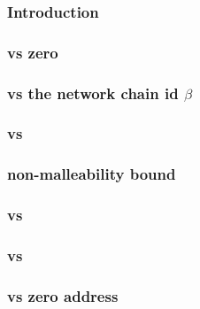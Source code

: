 \subsubsection{Introduction}                                    \label{rlp auth: comparisons: validity: intro}                             
\subsubsection{\locChainId{} vs zero}                           \label{rlp auth: comparisons: validity: chain id iszero}                   
\subsubsection{\locChainId{} vs the network chain id $\beta$}   \label{rlp auth: comparisons: validity: chain id vs network chain id}      
\subsubsection{\locNonce{} vs \maxNonce{}}                      \label{rlp auth: comparisons: validity: nonce EIP 2681 bound}              
\subsubsection{\locSignatureS{} non-malleability bound}         \label{rlp auth: comparisons: validity: signature s non malleabiliity}     
\subsubsection{\locNonce{} vs \locAuthorityNonce{}}             \label{rlp auth: comparisons: validity: nonce vs account nonce}            
\subsubsection{\locAuthority{} vs \locSenderAddress{}}          \label{rlp auth: comparisons: validity: authority vs sender address}       
\subsubsection{\locAuthority{} vs zero address}                 \label{rlp auth: comparisons: validity: authority vs zero address}         
